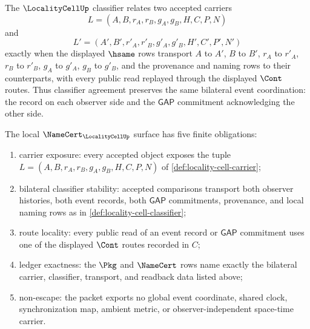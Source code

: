 \begin{definition}
\label{def:locality-cell-classifier}
The $\LocalityCellUp$ classifier relates two accepted carriers
$$
L=(A,B,r_A,r_B,g_A,g_B,H,C,P,N)
$$
and
$$
L'=(A',B',r'_A,r'_B,g'_A,g'_B,H',C',P',N')
$$
exactly when the displayed $\hsame$ rows transport $A$ to $A'$, $B$ to $B'$, $r_A$ to $r'_A$, $r_B$ to $r'_B$, $g_A$ to $g'_A$, $g_B$ to $g'_B$, and the provenance and naming rows to their counterparts, with every public read replayed through the displayed $\Cont$ routes. Thus classifier agreement preserves the same bilateral event coordination: the record on each observer side and the $\mathsf{GAP}$ commitment acknowledging the other side.
\end{definition}

\begin{theorem}
\label{thm:locality-cell-namecert-obligations}
The local $\NameCert_{\LocalityCellUp}$ surface has five finite obligations:
\begin{enumerate}
\item carrier exposure: every accepted object exposes the tuple $L=(A,B,r_A,r_B,g_A,g_B,H,C,P,N)$ of \autoref{def:locality-cell-carrier};
\item bilateral classifier stability: accepted comparisons transport both observer histories, both event records, both $\mathsf{GAP}$ commitments, provenance, and local naming rows as in \autoref{def:locality-cell-classifier};
\item route locality: every public read of an event record or $\mathsf{GAP}$ commitment uses one of the displayed $\Cont$ routes recorded in $C$;
\item ledger exactness: the $\Pkg$ and $\NameCert$ rows name exactly the bilateral carrier, classifier, transport, and readback data listed above;
\item non-escape: the packet exports no global event coordinate, shared clock, synchronization map, ambient metric, or observer-independent space-time carrier.
\end{enumerate}
\end{theorem}
